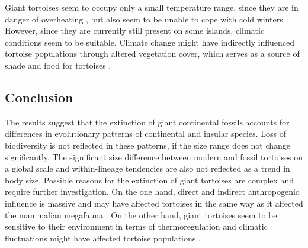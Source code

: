 Giant tortoises seem to occupy only a small temperature range, since they are in danger of overheating \citep{.}, but also seem to be unable to cope with cold winters \citep{Hibbard1960}. However, since they are currently still present on some islands, climatic conditions seem to be suitable. Climate change might have indirectly influenced tortoise populations through altered vegetation cover, which serves as a source of shade and food for tortoises \citep{Hunter2013, Cheke2016, Schleich1981}.








\subsection{Conclusion}
The results suggest that the extinction of giant continental fossils accounts for differences in evolutionary patterns of continental and insular species. Loss of biodiversity is not reflected in these patterns, if the size range does not change significantly.
The significant size difference between modern and fossil tortoises on a global scale and within-lineage tendencies are also not reflected as a trend in body size.
Possible reasons for the extinction of giant tortoises are complex and require further investigation. On the one hand, direct and indirect anthropogenic influence is massive and may have affected tortoises in the same way as it affected the mammalian megafauna \citep{Barnosky2004,Sandom2014}. On the other hand, giant tortoises seem to be sensitive to their environment in terms of thermoregulation and climatic fluctuations might have affected tortoise populations \citep{.}.

